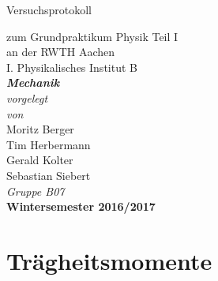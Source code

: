 \documentclass[12pt,a4paper]{article}
\author{Moritz}
\begin{document}
\setlength{\parindent}{0pt} 
\begin{center}
{\LARGE Versuchsprotokoll}\\
\begin{large}
zum Grundpraktikum Physik Teil I\\[0.4cm]
an der RWTH Aachen\\
I. Physikalisches Institut B\\[4.5cm]
\Large\textbf{\textsl{Mechanik}}\\[4cm]
\normalsize\textit{vorgelegt\\von}\\[0.4cm]
\large{Moritz Berger\\Tim Herbermann\\Gerald Kolter\\Sebastian Siebert}\\[1cm]
\large \textit{Gruppe B07} \\ [3cm]
\large \textbf{Wintersemester 2016/2017}
\end{large}
\end{center}
\newpage

\tableofcontents
\newpage

\part{Trägheitsmomente}
\end{document}
